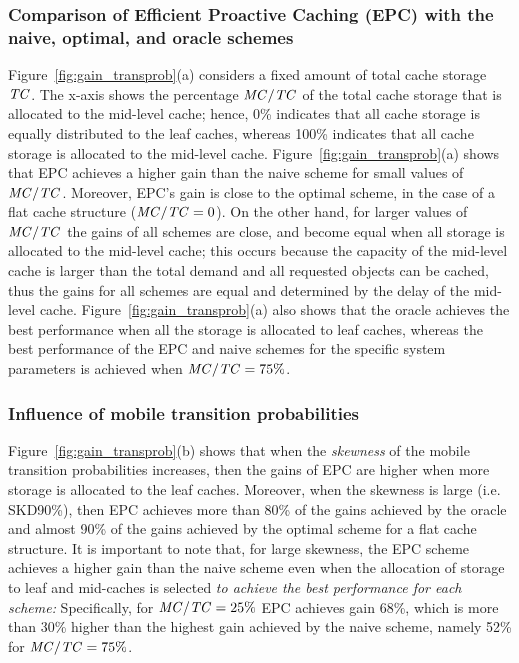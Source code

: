 \documentclass[conference]{IEEEtran}
\newcommand{\mynotex}[1]{}
\newcommand{\MC}{\mbox{\emph{MC}}}
\newcommand{\TC}{\mbox{\emph{TC}}}
\begin{document}
\subsubsection{Comparison of Efficient Proactive Caching (EPC)  with the naive, optimal, and oracle schemes} Figure~\ref{fig:gain_transprob}(a) considers a fixed amount of  total  cache storage $\TC$. The x-axis shows the percentage $\MC/\TC$ of the total cache storage that is allocated to the mid-level cache; hence, 0\% indicates that all cache storage is equally distributed to the leaf caches, whereas 100\% indicates that all cache storage is allocated to the mid-level cache.
Figure~\ref{fig:gain_transprob}(a) shows that  EPC achieves a higher gain than the naive scheme for small values of $\MC/\TC$. Moreover, EPC's gain is close to the optimal scheme, in the case of a flat cache structure ($\MC/\TC=0$). On the other hand, for larger values of  $\MC/\TC$ the gains of all schemes are close, and become equal when all storage is allocated to the mid-level cache; this occurs because the capacity of the mid-level cache is larger than the total demand and all requested objects can be cached, thus the gains for all schemes are equal and determined by the delay  of the mid-level cache.
Figure~\ref{fig:gain_transprob}(a) also shows that the oracle achieves the best performance when all the  storage is allocated to leaf caches, whereas the best performance of the EPC and naive schemes for the specific system parameters is achieved when $\MC/\TC=75\%$.

\mynotex{
\begin{itemize}
\item for different values of MB/TC
\item mention differences in percentage
\item mention performance of eql close to naive.
\item naive: independent of trans probs
\item oracle: also independent of trans probs
\end{itemize}
}

\subsubsection{Influence of mobile transition probabilities}
Figure~\ref{fig:gain_transprob}(b) shows that when the \emph{skewness} of the mobile transition probabilities increases, then the gains of  EPC are higher when more storage is allocated to the leaf caches.
Moreover,  when the skewness is large (i.e. SKD90\%), then  EPC achieves more than 80\% of the gains achieved by the oracle and almost 90\% of the gains achieved by the optimal scheme for a flat cache structure.
It is important to note that, for large skewness, the EPC scheme achieves  a higher gain than the naive scheme even when the allocation of storage to leaf and mid-caches is selected \emph{to achieve the best performance for each scheme:} Specifically, for $\MC/\TC=25\%$  EPC  achieves  gain 68\%, which is more than 30\% higher than the highest gain achieved by the naive scheme, namely 52\% for $\MC/\TC=75\%$.
\end{document}
